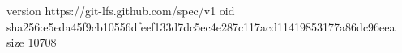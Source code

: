 version https://git-lfs.github.com/spec/v1
oid sha256:e5eda45f9cb10556dfeef133d7dc5ec4e287c117acd11419853177a86dc96eea
size 10708
